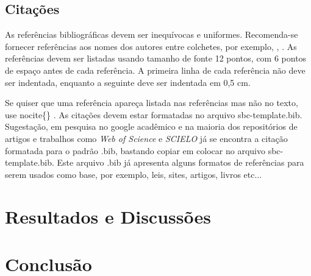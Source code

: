 \documentclass[12pt]{article}
\begin{document}
\subsection{Citações}
As referências bibliográficas devem ser inequívocas e uniformes. Recomenda-se fornecer referências aos nomes dos autores entre colchetes, por exemplo, \cite{knuth:84}, \cite{boulic:91}. As referências devem ser listadas usando tamanho de fonte 12 pontos, com 6 pontos de espaço antes de cada referência. A primeira linha de cada referência não deve ser indentada, enquanto a seguinte deve ser indentada em 0,5 cm.

Se quiser que uma referência apareça listada nas referências mas não no texto, use nocite\{\} \nocite{smith:99}. As citações devem estar formatadas no arquivo sbc-template.bib. Sugestação, em pesquisa no google acadêmico e na maioria dos repositórios de artigos e trabalhos como {\it Web of Science} e {\it SCIELO} já se encontra a citação formatada para o padrão .bib, bastando copiar em colocar no arquivo sbc-template.bib. Este arquivo .bib já apresenta alguns formatos de referências para serem usados como base, por exemplo, leis, sites, artigos, livros etc...
\section{Resultados e Discussões}



\section{Conclusão}





\end{document}
